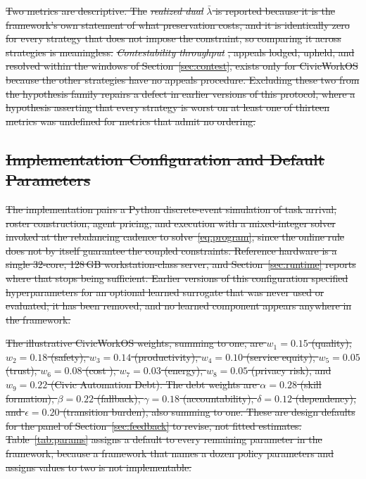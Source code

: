 \documentclass[utf8]{FrontiersinHarvard}
\providecommand{\DIFdel}[1]{{\protect\color{red}\sout{#1}}}                      %
\begin{document}
\DIFdel{Two metrics are descriptive. The }\textit{\DIFdel{realized dual}} %
\DIFdel{$\bar\lambda$ is reported because it is the framework's own statement of what preservation costs, and it is identically zero for every strategy that does not impose the constraint, so comparing it across strategies is meaningless. }\textit{\DIFdel{Contestability throughput}}%
\DIFdel{, appeals lodged, upheld, and resolved within the windows of Section~\ref{sec:contest}, exists only for CivicWorkOS because the other strategies have no appeals procedure. Excluding these two from the hypothesis family repairs a defect in earlier versions of this protocol, where a hypothesis asserting that every strategy is worst on at least one of thirteen metrics was undefined for metrics that admit no ordering.
	}%

\subsection{\DIFdel{Implementation Configuration and Default Parameters}}
\addtocounter{subsection}{-1}%

\DIFdel{The implementation pairs a Python discrete-event simulation of task arrival, roster construction, agent pricing, and execution with a mixed-integer solver invoked at the rebalancing cadence to solve~\eqref{eq:program}, since the online rule does not by itself guarantee the coupled constraints. Reference hardware is a single 32-core, 128\,GB workstation-class server, and Section~\ref{sec:runtime} reports where that stops being sufficient. Earlier versions of this configuration specified hyperparameters for an optional learned surrogate that was never used or evaluated; it has been removed, and no learned component appears anywhere in the framework.
	}%

\DIFdel{The illustrative CivicWorkOS weights, summing to one, are $w_1{=}0.15$ (quality), $w_2{=}0.18$ (safety), $w_3{=}0.14$ (productivity), $w_4{=}0.10$ (service equity), $w_5{=}0.05$ (trust), $w_6{=}0.08$ (cost ), $w_7{=}0.03$ (energy), $w_8{=}0.05$ (privacy risk), and $w_9{=}0.22$ (Civic Automation Debt). The debt weights are $\alpha{=}0.28$ (skill formation), $\beta{=}0.22$ (fallback), $\gamma{=}0.18$ (accountability), $\delta{=}0.12$ (dependency), and $\epsilon{=}0.20$ (transition burden), also summing to one. These are design defaults for the panel of Section~\ref{sec:feedback} to revise, not fitted estimates. Table~\ref{tab:params} assigns a default to every remaining parameter in the framework, because a framework that names a dozen policy parameters and assigns values to two is not implementable.
	}%
\end{document}
